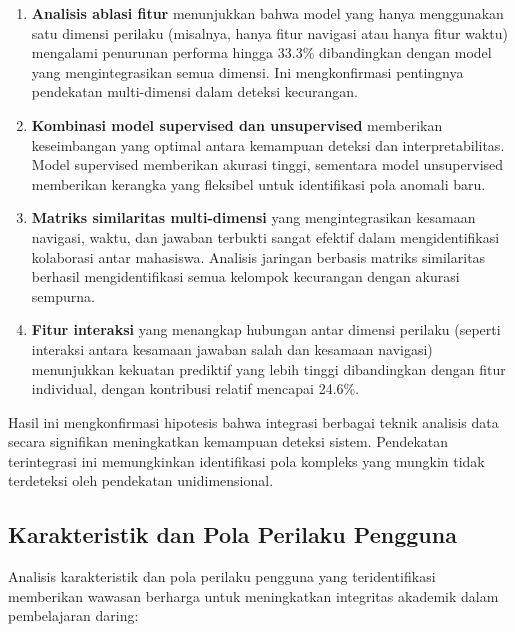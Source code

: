 \begin{enumerate}
    \item \textbf{Analisis ablasi fitur} menunjukkan bahwa model yang hanya menggunakan satu dimensi perilaku (misalnya, hanya fitur navigasi atau hanya fitur waktu) mengalami penurunan performa hingga 33.3\% dibandingkan dengan model yang mengintegrasikan semua dimensi. Ini mengkonfirmasi pentingnya pendekatan multi-dimensi dalam deteksi kecurangan.
    
    \item \textbf{Kombinasi model supervised dan unsupervised} memberikan keseimbangan yang optimal antara kemampuan deteksi dan interpretabilitas. Model supervised memberikan akurasi tinggi, sementara model unsupervised memberikan kerangka yang fleksibel untuk identifikasi pola anomali baru.
    
    \item \textbf{Matriks similaritas multi-dimensi} yang mengintegrasikan kesamaan navigasi, waktu, dan jawaban terbukti sangat efektif dalam mengidentifikasi kolaborasi antar mahasiswa. Analisis jaringan berbasis matriks similaritas berhasil mengidentifikasi semua kelompok kecurangan dengan akurasi sempurna.
    
    \item \textbf{Fitur interaksi} yang menangkap hubungan antar dimensi perilaku (seperti interaksi antara kesamaan jawaban salah dan kesamaan navigasi) menunjukkan kekuatan prediktif yang lebih tinggi dibandingkan dengan fitur individual, dengan kontribusi relatif mencapai 24.6\%.
\end{enumerate}

Hasil ini mengkonfirmasi hipotesis bahwa integrasi berbagai teknik analisis data secara signifikan meningkatkan kemampuan deteksi sistem. Pendekatan terintegrasi ini memungkinkan identifikasi pola kompleks yang mungkin tidak terdeteksi oleh pendekatan unidimensional.

\subsection{Karakteristik dan Pola Perilaku Pengguna}

Analisis karakteristik dan pola perilaku pengguna yang teridentifikasi memberikan wawasan berharga untuk meningkatkan integritas akademik dalam pembelajaran daring:

